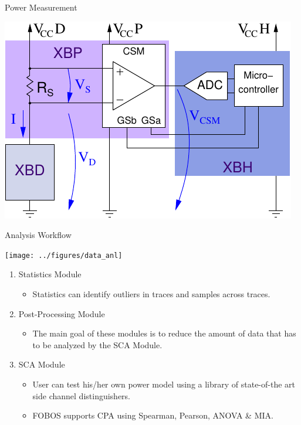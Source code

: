 \documentclass[xcolor=pdftex,dvipsnames,table,final]{beamer}
\begin{document}
\begin{frame}[fragile]{}
\begin{columns}[t]
\begin{column}{.31\linewidth}
\begin{block}{Power Measurement}
\begin{minipage}{0.31\linewidth}
	\end{minipage} 
        \begin{center}
          \includegraphics[scale=1.5]{../figures/ina225}
        \end{center} 
       \end{block}
       \begin{block}{Analysis Workflow}
        \vspace{-1ex}
        \begin{center}
          \texttt{[image: ../figures/data\_anl]}
        \end{center} 
        \vspace{-1ex}
        \begin{enumerate}
          \item Statistics Module
          \begin{itemize}
            \item Statistics can identify outliers in traces and samples across traces.
          \end{itemize}
          \item Post-Processing Module
          \begin{itemize}
            \item The main goal of these modules is to reduce the amount of data that 
                  has to be analyzed by the SCA Module.
          \end{itemize}
          \item SCA Module
          \begin{itemize}
            \item User can test his/her own power model using a library of state-of-the art side channel
                  distinguishers.
            \item FOBOS supports CPA using Spearman, Pearson, ANOVA \& MIA.
          \end{itemize}
        \end{enumerate}


\end{block}
\end{column}
\end{columns}
\end{frame}
\end{document}
